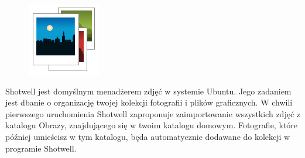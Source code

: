 \label{shotwell}\begin{figure}
	\vspace{-10pt}
	\includegraphics[width=\linewidth]{images/ikony_shotwell.png}
\end{figure}

Shotwell jest domyślnym menadżerem zdjęć w systemie Ubuntu. Jego zadaniem jest dbanie o organizację twojej kolekcji fotografii i plików graficznych. W chwili pierwszego uruchomienia Shotwell zaproponuje zaimportowanie wszystkich zdjęć z katalogu Obrazy, znajdującego się w twoim katalogu domowym. Fotografie, które później umieścisz w tym katalogu, będa automatycznie dodawane do kolekcji w programie Shotwell.

